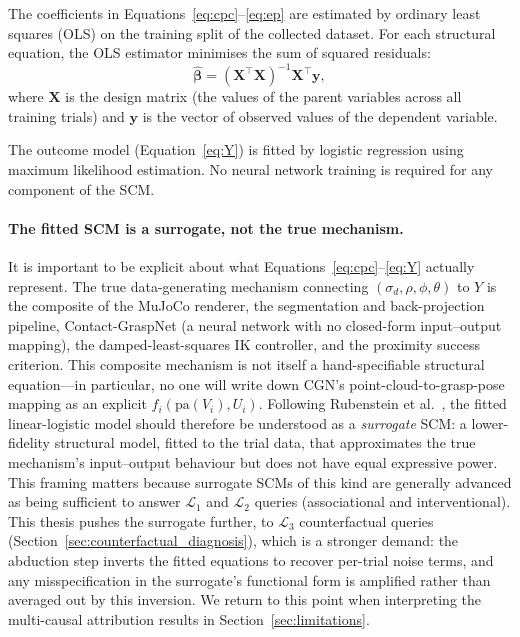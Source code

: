 \documentclass[11pt,a4paper]{report}
\begin{document}
The coefficients in Equations~\eqref{eq:cpc}--\eqref{eq:ep} are estimated by ordinary least squares (OLS) on the training split of the collected dataset. For each structural equation, the OLS estimator minimises the sum of squared residuals:
\begin{equation}
  \hat{\boldsymbol{\beta}} = (\mathbf{X}^{\top}\mathbf{X})^{-1} \mathbf{X}^{\top} \mathbf{y},
\end{equation}
where $\mathbf{X}$ is the design matrix (the values of the parent variables across all training trials) and $\mathbf{y}$ is the vector of observed values of the dependent variable.

The outcome model (Equation~\ref{eq:Y}) is fitted by logistic regression using maximum likelihood estimation. No neural network training is required for any component of the SCM.

\paragraph{The fitted SCM is a surrogate, not the true mechanism.} It is important to be explicit about what Equations~\eqref{eq:cpc}--\eqref{eq:Y} actually represent. The true data-generating mechanism connecting $(\sigma_d, \rho, \phi, \theta)$ to $Y$ is the composite of the MuJoCo renderer, the segmentation and back-projection pipeline, Contact-GraspNet (a neural network with no closed-form input--output mapping), the damped-least-squares IK controller, and the proximity success criterion. This composite mechanism is not itself a hand-specifiable structural equation---in particular, no one will write down CGN's point-cloud-to-grasp-pose mapping as an explicit $f_i(\text{pa}(V_i), U_i)$. Following Rubenstein et al.~\cite{rubenstein2017consistency}, the fitted linear-logistic model should therefore be understood as a \emph{surrogate} SCM: a lower-fidelity structural model, fitted to the trial data, that approximates the true mechanism's input--output behaviour but does not have equal expressive power. This framing matters because surrogate SCMs of this kind are generally advanced as being sufficient to answer $\mathcal{L}_1$ and $\mathcal{L}_2$ queries (associational and interventional). This thesis pushes the surrogate further, to $\mathcal{L}_3$ counterfactual queries (Section~\ref{sec:counterfactual_diagnosis}), which is a stronger demand: the abduction step inverts the fitted equations to recover per-trial noise terms, and any misspecification in the surrogate's functional form is amplified rather than averaged out by this inversion. We return to this point when interpreting the multi-causal attribution results in Section~\ref{sec:limitations}.
\end{document}
